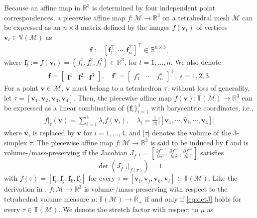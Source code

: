 \documentclass[onefignum,onetabnum]{siamonline220329}
\numberwithin{equation}{section}
\def\f{\mathbf{f}}
\def\bv{\mathbf{v}}
\begin{document}
\begin{sloppypar}
Because an affine map in $\mathbb{R}^3$ is determined by four independent point correspondences, a piecewise affine map $f:\mathcal{M}\to\mathbb{R}^3$ on a tetrahedral mesh $\mathcal{M}$ can be expressed as an $n\times 3$ matrix defined by the images $f(\bv_t)$ of vertices $\bv_t\in\mathbb{V}(\mathcal{M})$ as
\begin{align} \label{eq:f}
\mathbf{f}:=[\f_1^{\top}, \cdots, \f_n^{\top}]^{\top}\in\mathbb{R}^{n\times 3},    
\end{align}
where $\f_t :=f(\bv_t)=({f}_t^1, {f}_t^2, {f}_t^3)\in\mathbb{R}^{3}$, for $t=1, \dots, n$. We also denote
\begin{align*}
\mathbf{f}=\begin{bmatrix}
\mathbf{f}^1 & \mathbf{f}^2 & \mathbf{f}^3
\end{bmatrix}, \quad \mathbf{f}^s=\begin{bmatrix}
{f}_1^s & \cdots & {f}_n^s
\end{bmatrix}^{\top},\  s=1, 2, 3.
\end{align*}
For a point $\bv\in\mathcal{M}$, $\bv$ must belong to a tetrahedron $\tau$; without loss of generality, let $\tau=[\bv_1, \bv_2, \bv_3, \bv_4]$. Then, the piecewise affine map $f(\bv):\mathbb{T}(\mathcal{M})\to\mathbb{R}^3$ can be expressed as a linear combination of $\{\f_i\}_{i=1}^4$ with barycentric coordinates, i.e.,
\begin{align*}
f\rvert_{\tau}(\bv)=\sum_{i=1}^4\lambda_i f(\bv_i), \quad\lambda_i=\frac{1}{|\tau|}|[\bv_1,\cdots,\widehat{\bv}_i,\cdots, \bv_4]|
\end{align*}
where $\widehat{\bv}_i$ is replaced by $\bv$ for $i=1, \ldots, 4$, and $|\tau|$ denotes the volume of the $3$-simplex $\tau$. The piecewise affine map $f:\mathcal{M}\to\mathbb{B}^3$ is said to be induced by $\mathbf{f}$ and is volume-/mass-preserving if the Jacobian $J_{f^{-1}}=[\frac{\partial f^{-1}}{\partial u^1}, \frac{\partial f^{-1}}{\partial u^2}, \frac{\partial f^{-1}}{\partial u^3}]$ satisfies
\begin{equation} \label{eq:detJ}
\det(J_{f^{-1}}\rvert_{f(\tau)})=1
\end{equation}
with $f(\tau)=[\mathbf{f}_i, \mathbf{f}_j, \mathbf{f}_k, \mathbf{f}_{\ell}]$ for every $\tau =[\bv_i, \bv_j, \bv_k, \bv_{\ell}] \in\mathbb{T}(\mathcal{M})$. Like the derivation in \cite[Appendix A]{YuLL19}, $f:\mathcal{M}\to\mathbb{R}^3$ is volume-/mass-preserving with respect to the tetrahedral volume measure $\mu:\mathbb{T}(\mathcal{M})\to\mathbb{R}_+$ if and only if \eqref{eq:detJ} holds for every $\tau\in\mathbb{T}(\mathcal{M})$. We denote the stretch factor with respect to $\mu$ as

\end{sloppypar}
\end{document}

